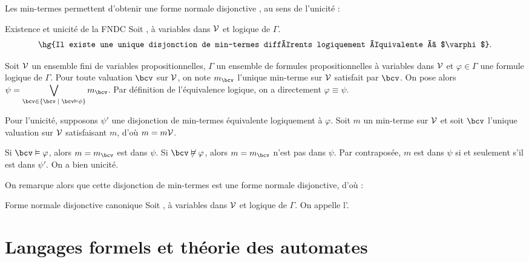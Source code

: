 \documentclass[a4paper,french,bookmarks]{book}
\begin{document}
    Les min-termes permettent d'obtenir une forme normale disjonctive , au sens de l'unicité :
    \begin{corollary}{Existence et unicité de la FNDC}{}
        Soit ,  à variables dans $\mathcal{V}$ et  logique de $\Gamma$.
        \[ \text{\hg{Il existe une unique disjonction de min-termes différents logiquement équivalente à $\varphi$}.} \]
    \end{corollary}
    \begin{nproof}
        Soit $\mathcal{V}$ un ensemble fini de variables propositionnelles, $\Gamma$ un ensemble de formules propositionnelles à variables dans $\mathcal{V}$ et $\varphi \in \Gamma$ une formule logique de $\Gamma$. Pour toute valuation $\bcv$ sur $\mathcal{V}$, on note $m_\bcv$ l'unique min-terme sur $\mathcal{V}$ satisfait par $\bcv$. On pose alors $\psi = \displaystyle\bigvee_{\bcv \in \ens{\bcv \enstq \bcv \vDash \phi}} m_\bcv$. Par définition de l'équivalence logique, on a directement $\varphi \equiv \psi$.\medskip
        
        Pour l'unicité, supposons $\psi'$ une disjonction de min-termes équivalente logiquement à $\varphi$. Soit $m$ un min-terme sur $\mathcal{V}$ et soit $\bcv$ l'unique valuation sur $\mathcal{V}$ satisfaisant $m$, d'où $m = m\mathcal{V}$. 
        
        Si $\bcv \vDash \varphi$, alors $m = m_\bcv$ est dans $\psi$. Si $\bcv \not\vDash \varphi$, alors $m = m_\bcv$ n'est pas dans $\psi$. Par contraposée, $m$ est dans $\psi$ si et seulement s'il est dans $\psi'$. On a bien unicité.
    \end{nproof}
    
    On remarque alors que cette disjonction de min-termes est une forme normale disjonctive, d'où :
    \begin{definition}{Forme normale disjonctive canonique}{}
        Soit ,  à variables dans $\mathcal{V}$ et  logique de $\Gamma$. On appelle  l'.
    \end{definition}
    
    \chapter{Langages formels et théorie des automates}
    
\end{document}
